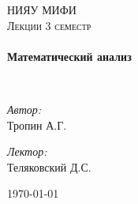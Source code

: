 \begin{titlepage}
  \begin{center}


    \textsc{\LARGE НИЯУ МИФИ}\\[1.5cm]

    \textsc{\Large Лекции 3 семестр}\\[0.5cm]

    \HRule \\[0.4cm]
    {\huge \bfseries Математический анализ\\[0.4cm]}

    \HRule \\[1.5cm]

    \begin{minipage}{0.4\textwidth}
      \begin{flushleft} \large
        \emph{Автор:}\\
        Тропин \textsc{А.Г.}
      \end{flushleft}
    \end{minipage}
    \begin{minipage}{0.4\textwidth}
      \begin{flushright} \large
        \emph{Лектор:} \\
        Теляковский \textsc{Д.С.}
      \end{flushright}
    \end{minipage}

    \vfill

    {\large \today}

  \end{center}
\end{titlepage}
